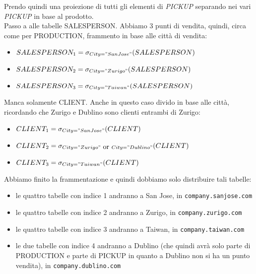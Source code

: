 \documentclass[a4paper,12pt, oneside]{book}
\begin{document}
\begin{esercizio}
 Prendo quindi una proiezione di tutti gli elementi di \textit{PICKUP} separando
 nei vari \textit{PICKUP} in base al prodotto.\\
 Passo a alle tabelle \textnormal{SALESPERSON}. Abbiamo 3
 punti di vendita, quindi, circa come per \textnormal{PRODUCTION}, frammento in
 base alle città di vendita:
 \begin{itemize}
   \item $SALESPERSON_1=\sigma_{City="San Jose"}(SALESPERSON)$
   \item $SALESPERSON_2=\sigma_{City="Zurigo"}(SALESPERSON)$
   \item $SALESPERSON_3=\sigma_{City="Taiwan"}(SALESPERSON)$
 \end{itemize}
 Manca solamente \textnormal{CLIENT}. Anche in questo caso divido in base alle
 città, ricordando che Zurigo e Dublino sono clienti entrambi di Zurigo:
  \begin{itemize}
   \item $CLIENT_1=\sigma_{City="San Jose"}(CLIENT)$
   \item $CLIENT_2=\sigma_{City="Zurigo"\mbox{ or }City="Dublino"}(CLIENT)$
   \item $CLIENT_3=\sigma_{City="Taiwan"}(CLIENT)$
 \end{itemize}
 Abbiamo finito la frammentazione e quindi dobbiamo solo distribuire tali
 tabelle: 
 \begin{itemize}
   \item le quattro tabelle con indice 1 andranno a San Jose, in
   \texttt{company.sanjose.com}
   \item le quattro tabelle con indice 2 andranno a Zurigo, in
   \texttt{company.zurigo.com} 
   \item le quattro tabelle con indice 3 andranno a Taiwan, in
   \texttt{company.taiwan.com} 
   \item le due tabelle con indice 4 andranno a Dublino (che quindi avrà solo
   parte di \textnormal{PRODUCTION} e parte di \textnormal{PICKUP} in quanto a
   Dublino non si ha un punto vendita), in \texttt{company.dublino.com}
 \end{itemize}
\end{esercizio}
\end{document}
